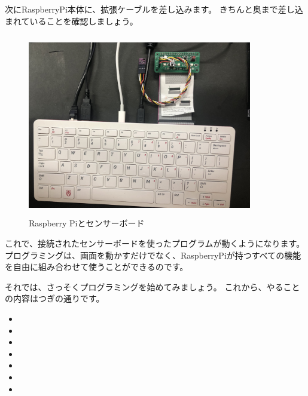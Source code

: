 次にRaspberryPi本体に、拡張ケーブルを差し込みます。
きちんと奥まで差し込まれていることを確認しましょう。

\begin{figure}[H]
    \begin{center}
        \includegraphics[keepaspectratio,width=9.79cm,height=7.955cm]{text02-img/sensor4.jpg}
        \caption{Raspberry Piとセンサーボード}
    \end{center}
\end{figure}

これで、接続されたセンサーボードを使ったプログラムが動くようになります。
プログラミングは、画面を動かすだけでなく、RaspberryPiが持つすべての機能を自由に組み合わせて使うことができるのです。

それでは、さっそくプログラミングを始めてみましょう。
これから、やることの内容はつぎの通りです。

\begin{itemize}
    \item {}
    \item {}
    \item {}
    \item {}
    \item {}
    \item {}
    \item {}
\end{itemize}